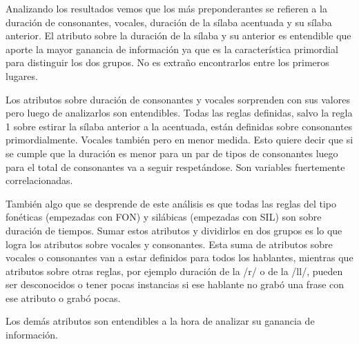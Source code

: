 Analizando los resultados vemos que los más preponderantes se refieren a la duración de consonantes, vocales, duración de la sílaba acentuada y su sílaba anterior. El atributo sobre la duración de la sílaba y su anterior es entendible que aporte la mayor ganancia de información ya que es la característica primordial para distinguir los dos grupos. No es extraño encontrarlos entre los primeros lugares. 

Los atributos sobre duración de consonantes y vocales sorprenden con sus valores pero luego de analizarlos son entendibles. Todas las reglas definidas, salvo la regla 1 sobre estirar la sílaba anterior a la acentuada, están definidas sobre consonantes primordialmente. Vocales también pero en menor medida. Esto quiere decir que si se cumple que la duración es menor para un par de tipos de consonantes luego para el total de consonantes va a seguir respetándose. Son variables fuertemente correlacionadas. 

También algo que se desprende de este análisis es que todas las reglas del tipo fonéticas (empezadas con FON) y silábicas (empezadas con SIL) son sobre duración de tiempos. Sumar estos atributos y dividirlos en dos grupos es lo que logra los atributos sobre vocales y consonantes. Esta suma de atributos sobre vocales o consonantes van a estar definidos para todos los hablantes, mientras que atributos sobre otras reglas, por ejemplo duración de la /r/ o de la /ll/, pueden ser desconocidos o tener pocas instancias si ese hablante no grabó una frase con ese atributo o grabó pocas. 

Los demás atributos son entendibles a la hora de analizar su ganancia de información.


